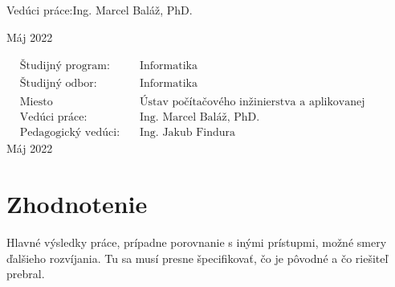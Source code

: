 \documentclass[12pt, a4paper, twoside, openright, slovak]{book}
\newcommand{\emptypage}{\newpage\thispagestyle{empty}\mbox{}\newpage}
\newcommand{\Supervisor}[0] {Ing. Marcel Baláž, PhD.}
\newcommand{\PedagogicalSupervisor}[0] {Ing. Jakub Findura}
\newcommand{\Date}[0] {Máj 2022}
\newcommand{\StudyProgramme}[0] {Informatika}
\newcommand{\StudyField}[0] {Informatika}
\newcommand{\Institute}[0] {Ústav počítačového inžinierstva a aplikovanej informatiky}
\begin{document}

\begin{flushleft}
Vedúci práce:\quad \Supervisor{\Large \par}
\vspace{\medskipamount}
\Date
\end{flushleft}

\emptypage


\begin{flushleft}
{\setlength{\mathindent}{0.1cm}
\begin{align*}
& \text{Študijný program:} && \text{\StudyProgramme} \\
& \text{Študijný odbor:} && \text{\StudyField} \\
& \text{Miesto vypracovania:} && \text{\Institute} \\
& \text{Vedúci práce:} && \text{\Supervisor} \\
& \text{Pedagogický vedúci:} && \text{\PedagogicalSupervisor}
\end{align*}}
\vspace{2\bigskipamount}
\Date
\end{flushleft}

\emptypage

\newpage
\thispagestyle{empty}

\newpage

\emptypage
{}





\renewcommand{\contentsname}{Obsah}
\thispagestyle{empty}
\tableofcontents{}
\emptypage









\chapter{Zhodnotenie}
Hlavné výsledky práce, prípadne porovnanie s inými prístupmi, možné smery ďalšieho rozvíjania.
Tu sa musí presne špecifikovať, čo je pôvodné a čo riešiteľ prebral.
\emptypage


\nocite{*}
\printbibliography[title={Literatúra}]

\appendix
{}
\end{document}

